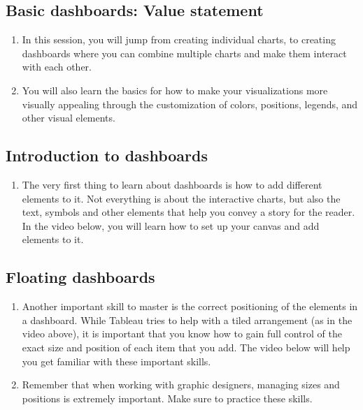 \documentclass[
]{book}
\providecommand{\tightlist}{%
  \setlength{\itemsep}{0pt}\setlength{\parskip}{0pt}}
\begin{document}
\hypertarget{basic-dashboards-value-statement}{%
\subsection{Basic dashboards: Value statement}\label{basic-dashboards-value-statement}}

\begin{enumerate}
\def\labelenumi{\arabic{enumi}.}
\tightlist
\item
  In this session, you will jump from creating individual charts, to creating dashboards where you can combine multiple charts and make them interact with each other.
\item
  You will also learn the basics for how to make your visualizations more visually appealing through the customization of colors, positions, legends, and other visual elements.
\end{enumerate}

\hypertarget{introduction-to-dashboards}{%
\subsection{Introduction to dashboards}\label{introduction-to-dashboards}}

\begin{enumerate}
\def\labelenumi{\arabic{enumi}.}
\tightlist
\item
  The very first thing to learn about dashboards is how to add different elements to it. Not everything is about the interactive charts, but also the text, symbols and other elements that help you convey a story for the reader. In the video below, you will learn how to set up your canvas and add elements to it.
\end{enumerate}

\hypertarget{floating-dashboards}{%
\subsection{Floating dashboards}\label{floating-dashboards}}

\begin{enumerate}
\def\labelenumi{\arabic{enumi}.}
\tightlist
\item
  Another important skill to master is the correct positioning of the elements in a dashboard. While Tableau tries to help with a tiled arrangement (as in the video above), it is important that you know how to gain full control of the exact size and position of each item that you add. The video below will help you get familiar with these important skills.
\item
  Remember that when working with graphic designers, managing sizes and positions is extremely important. Make sure to practice these skills.
\end{enumerate}
\end{document}

